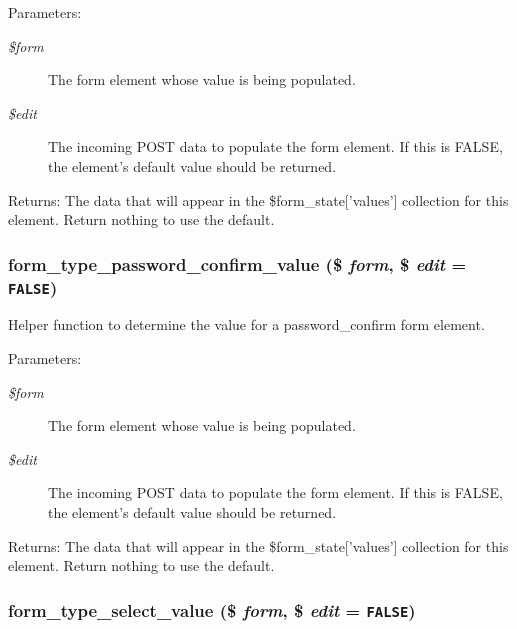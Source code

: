 \begin{Desc}
\item[Parameters:]
\begin{description}
\item[{\em \$form}]The form element whose value is being populated. \item[{\em \$edit}]The incoming POST data to populate the form element. If this is FALSE, the element's default value should be returned. \end{description}
\end{Desc}
\begin{Desc}
\item[Returns:]The data that will appear in the \$form\_\-state\mbox{[}'values'\mbox{]} collection for this element. Return nothing to use the default. \end{Desc}
\hypertarget{group__form__api_gf3479512bae1569cf68059608ecfe29d}{
\subsubsection[{form\_\-type\_\-password\_\-confirm\_\-value}]{\setlength{\rightskip}{0pt plus 5cm}form\_\-type\_\-password\_\-confirm\_\-value (\$ {\em form}, \/  \$ {\em edit} = {\tt FALSE})}}
\label{group__form__api_gf3479512bae1569cf68059608ecfe29d}


Helper function to determine the value for a password\_\-confirm form element.

\begin{Desc}
\item[Parameters:]
\begin{description}
\item[{\em \$form}]The form element whose value is being populated. \item[{\em \$edit}]The incoming POST data to populate the form element. If this is FALSE, the element's default value should be returned. \end{description}
\end{Desc}
\begin{Desc}
\item[Returns:]The data that will appear in the \$form\_\-state\mbox{[}'values'\mbox{]} collection for this element. Return nothing to use the default. \end{Desc}
\hypertarget{group__form__api_g0b794da7fc875fa20913a98532a826d3}{
\subsubsection[{form\_\-type\_\-select\_\-value}]{\setlength{\rightskip}{0pt plus 5cm}form\_\-type\_\-select\_\-value (\$ {\em form}, \/  \$ {\em edit} = {\tt FALSE})}}
\label{group__form__api_g0b794da7fc875fa20913a98532a826d3}


